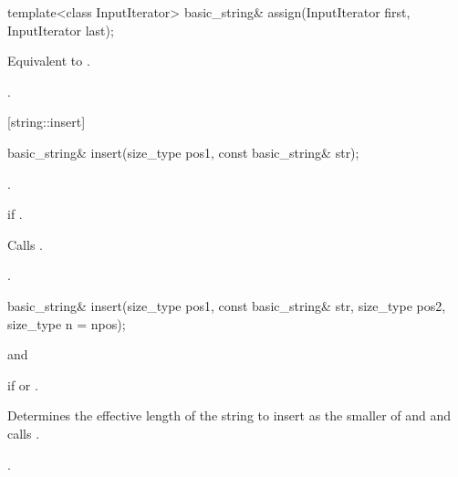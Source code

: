 %
%
\begin{itemdecl}
template<class InputIterator>
  basic_string& assign(InputIterator first, InputIterator last);
\end{itemdecl}

\begin{itemdescr}
\pnum
\effects Equivalent to .

\pnum
\returns
{}.
\end{itemdescr}

[string::insert]{}

%
%
\begin{itemdecl}
basic_string&
  insert(size_type pos1,
         const basic_string& str);
\end{itemdecl}

\begin{itemdescr}
\pnum
\requires {}.

\pnum
\throws {} if .

\pnum
\effects Calls .

\pnum
\returns
{}.
\end{itemdescr}

%
%
\begin{itemdecl}
basic_string&
  insert(size_type pos1,
         const basic_string& str,
         size_type pos2, size_type n = npos);
\end{itemdecl}

\begin{itemdescr}
\pnum
\requires
{}
and

\pnum
\throws
{}
if
or
.

\pnum
\effects
Determines the effective length  of the string to insert as the smaller
of  and
 and calls .

\pnum
\returns
{}.
\end{itemdescr}

